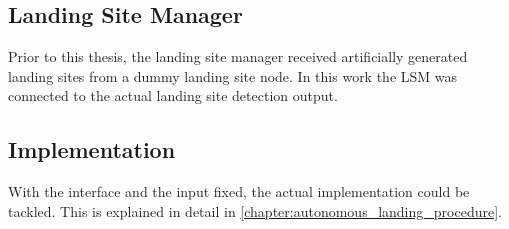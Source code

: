 \subsection{Landing Site Manager}

Prior to this thesis, the landing site manager received artificially generated landing sites from a dummy landing site node. In this work the LSM was connected to the actual landing site detection output. 


\subsection{Implementation}

With the interface and the input fixed, the actual implementation could be tackled. This is explained in detail in \cref{chapter:autonomous_landing_procedure}.
